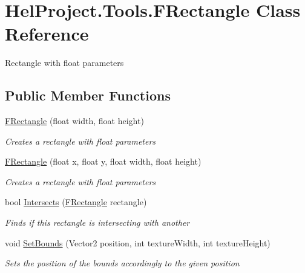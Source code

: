 \hypertarget{class_hel_project_1_1_tools_1_1_f_rectangle}{}\section{Hel\+Project.\+Tools.\+F\+Rectangle Class Reference}
\label{class_hel_project_1_1_tools_1_1_f_rectangle}


Rectangle with float parameters  


\subsection*{Public Member Functions}
\begin{DoxyCompactItemize}
\item 
\hyperlink{class_hel_project_1_1_tools_1_1_f_rectangle_a3da9b75fa9535a7e3bd6ed70d4a29659}{F\+Rectangle} (float width, float height)
\begin{DoxyCompactList}\small\item\em Creates a rectangle with float parameters \end{DoxyCompactList}\item 
\hyperlink{class_hel_project_1_1_tools_1_1_f_rectangle_ab6dd12fc6a5ac36eeab15210891a1b11}{F\+Rectangle} (float x, float y, float width, float height)
\begin{DoxyCompactList}\small\item\em Creates a rectangle with float parameters \end{DoxyCompactList}\item 
bool \hyperlink{class_hel_project_1_1_tools_1_1_f_rectangle_a2019f4db5e6a0da6eb5db3a5be41eecb}{Intersects} (\hyperlink{class_hel_project_1_1_tools_1_1_f_rectangle}{F\+Rectangle} rectangle)
\begin{DoxyCompactList}\small\item\em Finds if this rectangle is intersecting with another \end{DoxyCompactList}\item 
void \hyperlink{class_hel_project_1_1_tools_1_1_f_rectangle_ac285d24e4e9b2d2c8feeed0f46c43cd8}{Set\+Bounds} (Vector2 position, int texture\+Width, int texture\+Height)
\begin{DoxyCompactList}\small\item\em Sets the position of the bounds accordingly to the given position \end{DoxyCompactList}\end{DoxyCompactItemize}
